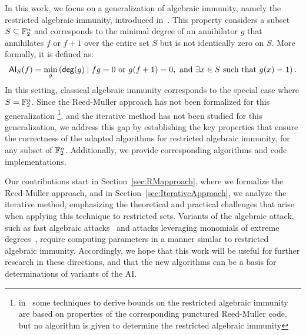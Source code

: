 \documentclass[11pt]{llncs}
\begin{document}
In this work, we focus on a generalization of algebraic immunity, namely the restricted algebraic immunity, introduced in~\cite{TOSC:CarMeaRot17}.  
This property considers a subset $S \subseteq \mathbb{F}_2^n$ and corresponds to the minimal degree of an annihilator $g$ that annihilates $f$ or $f+1$ over the entire set $S$ but is not identically zero on $S$. 
More formally, it is defined as:
\[
\mathsf{AI}_S(f) = \min_g\left(\mathsf{deg}(g) \mid fg = 0 \text{ or } g(f+1) = 0, \text{ and } \exists x \in S \text{ such that } g(x) = 1 \right).
\]
In this setting, classical algebraic immunity corresponds to the special case where $S = \mathbb{F}_2^n$.  
Since the Reed-Muller approach has not been formalized for this generalization \footnote{in~\cite{TOSC:CarMeaRot17} some techniques to derive bounds on the restricted algebraic immunity are based on properties of the corresponding punctured Reed-Muller code, but no algorithm is given to determine the restricted algebraic immunity}, and the iterative method has not been studied for this generalization, we address this gap by establishing the key properties that ensure the correctness of the adapted algorithms for restricted algebraic immunity, for any subset of $\mathbb{F}_2^n$. 
Additionally, we provide corresponding algorithms and code implementations.  



Our contributions start in Section~\ref{sec:RMapproach}, where we formalize the Reed-Muller approach, and in Section~\ref{sec:IterativeApproach}, we analyze the iterative method, emphasizing the theoretical and practical challenges that arise when applying this technique to restricted sets. 
Variants of the algebraic attack, such as fast algebraic attacks~\cite{C:Courtois03,FSE:Armknecht04} and attacks leveraging monomials of extreme degrees~\cite{CIC:MeauxWang25}, require computing parameters in a manner similar to restricted algebraic immunity. 
Accordingly, we hope that this work will be useful for further research in these directions, and that the new algorithms can be a basis for determinations of variants of the AI.
\end{document}
